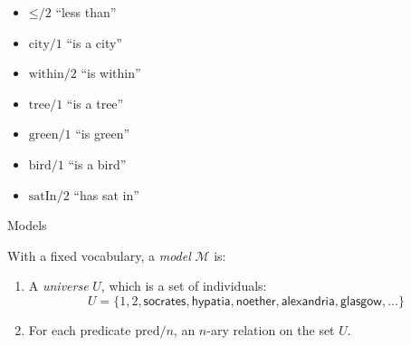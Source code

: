 \documentclass[xetex,aspectratio=169,14pt,hyperref={pdfpagelabels=true,pdflang={en-GB}}]{beamer}
\begin{document}
\begin{frame}
  \begin{itemize}
  \item $\mathord{\leq}/2$ \quad \textcolor{black!60}{``less than''}
  \end{itemize}

  \bigskip

  \begin{itemize}
  \item $\mathrm{city}/1$ \quad \textcolor{black!60}{``is a city''}
  \item $\mathrm{within}/2$ \quad \textcolor{black!60}{``is within''}
  \end{itemize}

  \bigskip

  \begin{itemize}
  \item $\mathrm{tree}/1$ \quad \textcolor{black!60}{``is a tree''}
  \item $\mathrm{green}/1$ \quad \textcolor{black!60}{``is green''}
  \item $\mathrm{bird}/1$ \quad \textcolor{black!60}{``is a bird''}
  \item $\mathrm{satIn}/2$ \quad \textcolor{black!60}{``has sat in''}
  \end{itemize}
\end{frame}

\begin{frame}
  {Models}

  With a fixed vocabulary, a \emph{model} $\mathcal{M}$ is:
  \begin{enumerate}
  \item A \emph{universe} $U$, which is a set of individuals:
    \begin{displaymath}
      U = \{ 1, 2, \mathsf{socrates}, \mathsf{hypatia}, \mathsf{noether}, \mathsf{alexandria}, \mathsf{glasgow}, \dots \}
    \end{displaymath}
  \item For each predicate $\mathrm{pred}/n$, an $n$-ary
    relation on the set $U$.
  \end{enumerate}
\end{frame}
\end{document}

